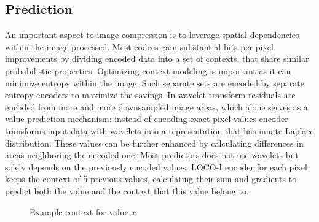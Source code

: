 \subsection{Prediction}
An important aspect to image compression is to leverage spatial dependencies within the image processed. Most codecs 
gain substantial bits per pixel improvements by dividing encoded data into a set of contexts, that share similar 
probabilistic properties. Optimizing context modeling is important as it can minimize entropy within the image. 
Such separate sets are encoded by separate entropy encoders to maximize the savings.
In wavelet transform residuals are encoded from more and more downsampled image areas, which alone serves as a value prediction mechanism: instead of encoding 
exact pixel values encoder transforms input data with wavelets into a representation that has innate Laplace distribution. These values
can be further enhanced by calculating differences in areas neighboring the encoded one. Most predictors does not use wavelets
but solely depends on the previously encoded values. LOCO-I encoder for each pixel keeps the context of 5 previous values, calculating their sum 
and gradients to predict both the value and the context that this value belong to.
\begin{figure}[ht]
    \centering
    \caption{Example context for value $x$} 
\end{figure}

